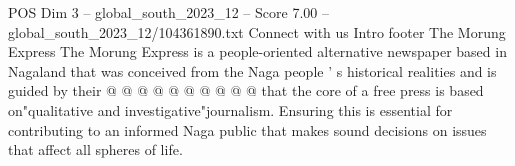 \begin{textsample}{POS Dim 3 – global\_south\_2023\_12 – Score 7.00 – global\_south\_2023\_12/104361890.txt}
Connect with us Intro footer The Morung Express The Morung Express is a people-oriented alternative newspaper based in Nagaland that was conceived from the Naga people ' s historical realities and is guided by their @ @ @ @ @ @ @ @ @ @ that the core of a free press is based on"qualitative and investigative"journalism.
Ensuring this is essential for contributing to an informed Naga public that makes sound decisions on issues that affect all spheres of life.

\end{textsample}
